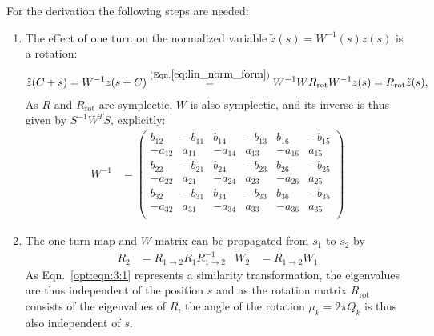 For the derivation the following steps are needed:
\begin{enumerate}
\item The effect of one turn on the normalized variable $\tilde z(s)=W^{-1}(s) z(s)$ is a rotation:
\begin{align}\label{opt:eqn:3:1}
\tilde z(C+s) = W^{-1}z(s+C)\overset{(\rm Eqn.\ref{eq:lin_norm_form})}{=}W^{-1}W R_{\mathrm{rot}} W^{-1}z(s)= R_{\mathrm{rot}}\tilde z(s),
\end{align}
As $R$ and $R_{\mathrm{rot}}$ are symplectic, $W$ is also symplectic, and its inverse is thus given by $S^{-1}W^{T}S$, explicitly:
\begin{align}
W^{-1}&=
\left(
\begin{array}{cccccc}
b_{12} & - b_{11} &   b_{14} & - b_{13} &   b_{16} & - b_{15}\\
- a_{12} &   a_{11} & - a_{14} &   a_{13} & - a_{16} &   a_{15}\\
b_{22} & - b_{21} &   b_{24} & - b_{23} &   b_{26} & - b_{25}\\
- a_{22} &   a_{21} & - a_{24} &   a_{23} & - a_{26} &   a_{25}\\
b_{32} & - b_{31} &   b_{34} & - b_{33} &   b_{36} & - b_{35}\\
- a_{32} &   a_{31} & - a_{34} &   a_{33} & - a_{36} &   a_{35}\\
\end{array}
\right)
\label{eq:winv}
\end{align}
\item The one-turn map and $W$-matrix can be propagated from $s_1$ to $s_2$ by
\begin{align}
R_2&=R_{1 \to 2} R_1 R^{-1}_{1 \to 2}  &
W_2&=R_{1 \to 2} W_1
\end{align}
As Eqn.~\ref{opt:eqn:3:1} represents a similarity transformation, the eigenvalues are thus independent of the position $s$ and as the rotation matrix $R_{\mathrm{rot}}$ consists of the eigenvalues of $R$, the angle of the rotation $\mu_k=2\pi Q_k$ is thus also independent of $s$.


\end{enumerate}
